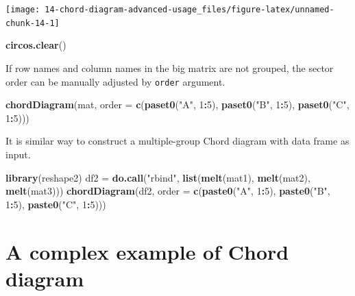 \documentclass[]{book}
\newenvironment{Shaded}{\begin{snugshade}}{\end{snugshade}}
\newcommand{\KeywordTok}[1]{\textcolor[rgb]{0.13,0.29,0.53}{\textbf{#1}}}
\newcommand{\DataTypeTok}[1]{\textcolor[rgb]{0.13,0.29,0.53}{#1}}
\newcommand{\DecValTok}[1]{\textcolor[rgb]{0.00,0.00,0.81}{#1}}
\newcommand{\StringTok}[1]{\textcolor[rgb]{0.31,0.60,0.02}{#1}}
\newcommand{\OperatorTok}[1]{\textcolor[rgb]{0.81,0.36,0.00}{\textbf{#1}}}
\newcommand{\NormalTok}[1]{#1}
\theoremstyle{definition}
\theoremstyle{definition}
\theoremstyle{remark}
\begin{document}
\begin{center}\texttt{[image: 14-chord-diagram-advanced-usage\_files/figure-latex/unnamed-chunk-14-1]} \end{center}

\begin{Shaded}
\begin{Highlighting}[]
\KeywordTok{circos.clear}\NormalTok{()}
\end{Highlighting}
\end{Shaded}

If row names and column names in the big matrix are not grouped, the
sector order can be manually adjusted by \texttt{order} argument.

\begin{Shaded}
\begin{Highlighting}[]
\KeywordTok{chordDiagram}\NormalTok{(mat, }\DataTypeTok{order =} \KeywordTok{c}\NormalTok{(}\KeywordTok{paset0}\NormalTok{(}\StringTok{"A"}\NormalTok{, }\DecValTok{1}\OperatorTok{:}\DecValTok{5}\NormalTok{), }\KeywordTok{paset0}\NormalTok{(}\StringTok{"B"}\NormalTok{, }\DecValTok{1}\OperatorTok{:}\DecValTok{5}\NormalTok{), }\KeywordTok{paset0}\NormalTok{(}\StringTok{"C"}\NormalTok{, }\DecValTok{1}\OperatorTok{:}\DecValTok{5}\NormalTok{)))}
\end{Highlighting}
\end{Shaded}

It is similar way to construct a multiple-group Chord diagram with data
frame as input.

\begin{Shaded}
\begin{Highlighting}[]
\KeywordTok{library}\NormalTok{(reshape2)}
\NormalTok{df2 =}\StringTok{ }\KeywordTok{do.call}\NormalTok{(}\StringTok{"rbind"}\NormalTok{, }\KeywordTok{list}\NormalTok{(}\KeywordTok{melt}\NormalTok{(mat1), }\KeywordTok{melt}\NormalTok{(mat2), }\KeywordTok{melt}\NormalTok{(mat3)))}
\KeywordTok{chordDiagram}\NormalTok{(df2, }\DataTypeTok{order =} \KeywordTok{c}\NormalTok{(}\KeywordTok{paste0}\NormalTok{(}\StringTok{"A"}\NormalTok{, }\DecValTok{1}\OperatorTok{:}\DecValTok{5}\NormalTok{), }\KeywordTok{paste0}\NormalTok{(}\StringTok{"B"}\NormalTok{, }\DecValTok{1}\OperatorTok{:}\DecValTok{5}\NormalTok{), }\KeywordTok{paste0}\NormalTok{(}\StringTok{"C"}\NormalTok{, }\DecValTok{1}\OperatorTok{:}\DecValTok{5}\NormalTok{)))}
\end{Highlighting}
\end{Shaded}

\chapter{A complex example of Chord
diagram}\label{a-complex-example-of-chord-diagram}
\end{document}
